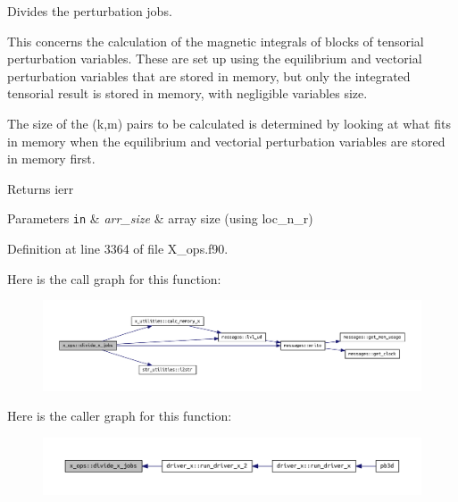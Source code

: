 Divides the perturbation jobs. 

This concerns the calculation of the magnetic integrals of blocks of tensorial perturbation variables. These are set up using the equilibrium and vectorial perturbation variables that are stored in memory, but only the integrated tensorial result is stored in memory, with negligible variables size.

The size of the (k,m) pairs to be calculated is determined by looking at what fits in memory when the equilibrium and vectorial perturbation variables are stored in memory first.

\begin{DoxyReturn}{Returns}
ierr
\end{DoxyReturn}

\begin{DoxyParams}[1]{Parameters}
\mbox{\tt in}  & {\em arr\+\_\+size} & array size (using loc\+\_\+n\+\_\+r) \\
\hline
\end{DoxyParams}


Definition at line 3364 of file X\+\_\+ops.\+f90.

Here is the call graph for this function\+:\nopagebreak
\begin{figure}[H]
\begin{center}
\leavevmode
\includegraphics[width=350pt]{namespacex__ops_a677c88d85fe1bfbf3579a2421ce16f2f_cgraph}
\end{center}
\end{figure}
Here is the caller graph for this function\+:\nopagebreak
\begin{figure}[H]
\begin{center}
\leavevmode
\includegraphics[width=350pt]{namespacex__ops_a677c88d85fe1bfbf3579a2421ce16f2f_icgraph}
\end{center}
\end{figure}
\mbox{\label{namespacex__ops_a73a80c582379669f8e07b09dd7456878}} 
